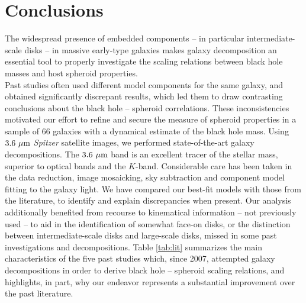 \documentclass[preprint2]{emulateapj}
\begin{document}
\section{Conclusions}
\label{sec:concl}
The widespread presence of embedded components -- in particular intermediate-scale disks -- in massive early-type galaxies 
makes galaxy decomposition an essential tool to properly investigate the scaling relations between black hole masses 
and host spheroid properties. \\
Past studies often used different model components for the same galaxy, and obtained significantly discrepant results,  
which led them to draw contrasting conclusions about the black hole -- spheroid correlations.
These inconsistencies motivated our effort to refine and secure the measure of spheroid properties in a sample of 66 galaxies 
with a dynamical estimate of the black hole mass. 
Using $3.6~\rm \mu m$ \emph{Spitzer} satellite images, 
we performed state-of-the-art galaxy decompositions. 
The $3.6~\rm \mu m$ band is an excellent tracer of the stellar mass, superior to optical bands and the $K$-band. 
Considerable care has been taken in the data reduction, image mosaicking, sky subtraction and component model fitting to the galaxy light.
We have compared our best-fit models with those from the literature, 
to identify and explain discrepancies when present. 
Our analysis additionally benefited from recourse to kinematical information -- not previously used -- to aid in the identification of 
somewhat face-on disks, or the distinction between intermediate-scale disks and large-scale disks, 
missed in some past investigations and decompositions.
Table \ref{tab:lit} summarizes the main characteristics of the five past studies which, since 2007, attempted galaxy decompositions 
in order to derive black hole -- spheroid scaling relations, 
and highlights, in part, why our endeavor represents a substantial improvement over the past literature. \\
\end{document}
